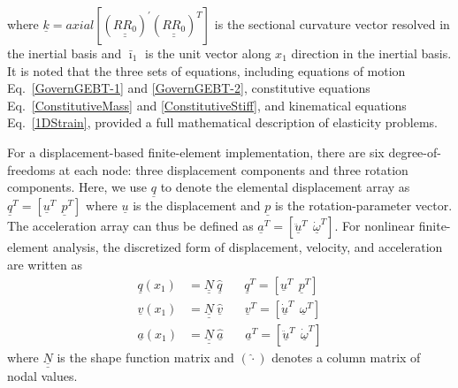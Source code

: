 \documentclass{aiaa-tc}
\newcommand{\tens}[1]{\underline{\underline{#1}}}
\renewcommand{\vec}[1]{\underline{#1}}
\begin{document}
where $\vec{k} = axial [(\tens{R R_0})^\prime (\tens{R R_0})^T]$ is the sectional
curvature vector resolved in the inertial basis and $\bar{\imath}_1$ is the unit
vector along $x_1$ direction in the inertial basis. It is noted that the
three sets of equations, including equations of motion
Eq.~\eqref{GovernGEBT-1} and \eqref{GovernGEBT-2}, constitutive equations
Eq.~\eqref{ConstitutiveMass} and \eqref{ConstitutiveStiff}, and kinematical
equations Eq.~\eqref{1DStrain}, provided a full mathematical description of elasticity problems. 

For a displacement-based finite-element implementation, there are six
degree-of-freedoms at each node: three displacement components and three
rotation components. Here, we use $\vec{q}$ to denote the elemental
displacement array as $\underline{q}^T=\left[
\underline{u}^T~~\underline{p}^T\right]$ where $\vec{u}$ is the
displacement and $\vec{p}$ is the rotation-parameter vector. The
acceleration array can thus be defined as $\underline{a}^T=\left[
\ddot{\underline{u}}^T~~ \dot{\underline{\omega}}^T \right]$. For nonlinear
finite-element analysis, the discretized form of
displacement, velocity, and acceleration are written as
\begin{align}
	\label{DiscretizedDisp}
	\underline{q} (x_1) &= \underline{\underline{N}} ~\hat{\underline{q}}~~~~~~~~\underline{q}^T = \left[ \underline{u}^T~~\underline{p}^T \right] \\
	\label{DiscretizedVel}
	\underline{v}(x_1) &= \underline{\underline{N}}~\hat{\underline{v}}~~~~~~~~\underline{v}^T = \left[\underline{\dot{u}}^T~~\underline{\omega}^T \right] \\
	\label{DiscretizedAcc}
	\underline{a}(x_1) &= \underline{\underline{N}}~ \hat{\underline{a}}~~~~~~~~\underline{a}^T = \left[ \ddot{\underline{u}}^T~~\dot{\underline{\omega}}^T \right]	
\end{align}
where $\tens{N}$ is the shape function matrix and $(\hat{\cdot})$ denotes a
column matrix of nodal values.
\end{document}
